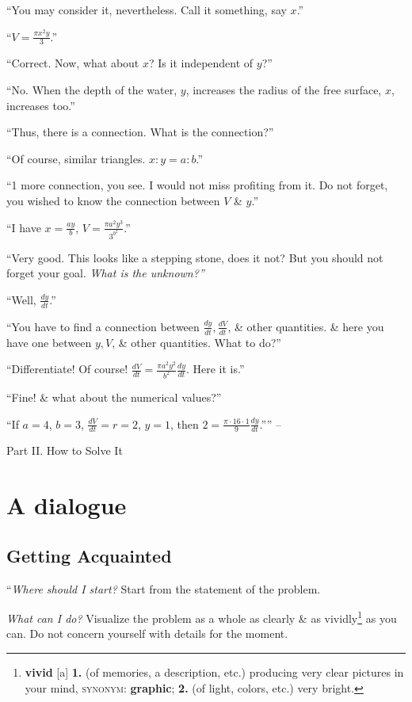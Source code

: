 \documentclass[oneside]{book}
\numberwithin{equation}{section}
\begin{document}
``You may consider it, nevertheless. Call it something, say $x$.''

``$V = \frac{\pi x^2y}{3}$.''

``Correct. Now, what about $x$? Is it independent of $y$?''

``No. When the depth of the water, $y$, increases the radius of the free surface, $x$, increases too.''

``Thus, there is a connection. What is the connection?''

``Of course, similar triangles. $x:y = a:b$.''

``1 more connection, you see. I would not miss profiting from it. Do not forget, you wished to know the connection between $V$ \& $y$.''

``I have $x = \frac{ay}{b}$, $V = \frac{\pi a^2y^3}{3^{b^2}}$.''

``Very good. This looks like a stepping stone, does it not? But you should not forget your goal. \textit{What is the unknown?''}

``Well, $\frac{dy}{dt}$.''

``You have to find a connection between $\frac{dy}{dt},\frac{dV}{dt}$, \& other quantities. \& here you have one between $y,V$, \& other quantities. What to do?''

``Differentiate! Of course! $\frac{dV}{dt} = \frac{\pi a^2y^2}{b^2}\frac{dy}{dt}$. Here it is.''

``Fine! \& what about the numerical values?''

``If $a = 4$, $b = 3$, $\frac{dV}{dt} = r = 2$, $y = 1$, then $2 = \frac{\pi\cdot 16\cdot 1}{9}\frac{dy}{dt}$.'''' -- \cite[pp. 29--32]{Polya2014}

\begin{center}
	\huge Part II. How to Solve It
\end{center}

\section{A dialogue}

\subsection{Getting Acquainted}
``\textit{Where should I start?} Start from the statement of the problem.

\textit{What can I do?} Visualize the problem as a whole as clearly \& as vividly\footnote{\textbf{vivid} [a] \textbf{1.} (of memories, a description, etc.) producing very clear pictures in your mind, \textsc{synonym}: \textbf{graphic}; \textbf{2.} (of light, colors, etc.) very bright.} as you can. Do not concern yourself with details for the moment.
\end{document}
